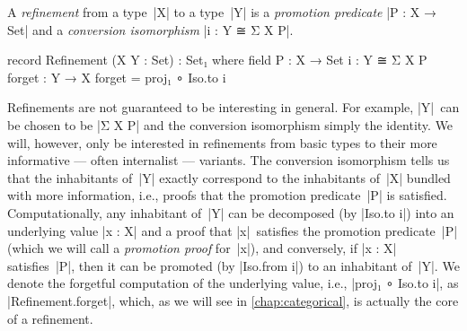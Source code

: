 A \emph{refinement} from a type~|X| to a type~|Y| is a \emph{promotion predicate} |P : X → Set| and a \emph{conversion isomorphism} |i : Y ≅ Σ X P|.
\begin{code}
record Refinement (X Y : Set) : Set₁ where
  field
    P  :  X → Set
    i  :  Y ≅ Σ X P
  forget : Y → X
  forget = proj₁ ∘ Iso.to i
\end{code}
Refinements are not guaranteed to be interesting in general.
For example, |Y|~can be chosen to be |Σ X P| and the conversion isomorphism simply the identity.
We will, however, only be interested in refinements from basic types to their more informative --- often internalist --- variants.
The conversion isomorphism tells us that the inhabitants of~|Y| exactly correspond to the inhabitants of~|X| bundled with more information, i.e., proofs that the promotion predicate~|P| is satisfied.
Computationally, any inhabitant of~|Y| can be decomposed (by |Iso.to i|\kern1pt) into an underlying value |x : X| and a proof that |x|~satisfies the promotion predicate~|P| (which we will call a \emph{promotion proof} for~|x|), and conversely, if |x : X| satisfies~|P|, then it can be promoted (by |Iso.from i|\kern1pt) to an inhabitant of~|Y|.
We denote the forgetful computation of the underlying value, i.e., |proj₁ ∘ Iso.to i|, as |Refinement.forget|, which, as we will see in \autoref{chap:categorical}, is actually the core of a refinement.


